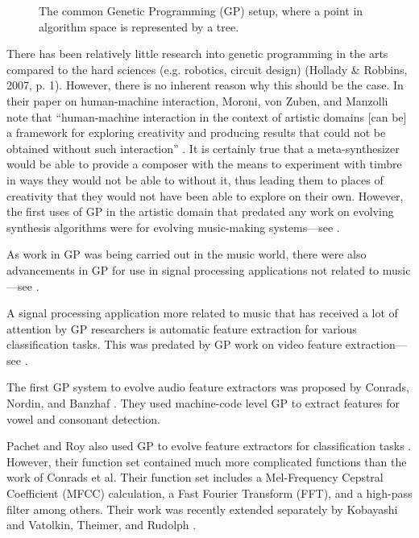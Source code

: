 \documentclass[a4paper,12pt]{report} 	%
\numberwithin{figure}{chapter}
\numberwithin{table}{chapter}
\numberwithin{equation}{chapter}
\begin{document}
\begin{flushleft}
\begin{figure}[h!]
\begin{center}
\caption[The Genetic Programming Paradigm]{The common Genetic Programming (GP) setup, where a point in algorithm space is represented by a tree.}
\end{center}
\end{figure}
There has been relatively little research into genetic programming in the arts compared to the hard sciences (e.g. robotics, circuit design) (Hollady \& Robbins, 2007, p. 1). However, there is no inherent reason why this should be the case. In their paper on human-machine interaction, Moroni, von Zuben, and Manzolli note that ``human-machine interaction in the context of artistic domains [can be] a framework for exploring creativity and producing results that could not be obtained without such interaction'' \cite[p. 185]{Moroni:2002oa}. It is certainly true that a meta-synthesizer would be able to provide a composer with the means to experiment with timbre in ways they would not be able to without it, thus leading them to places of creativity that they would not have been able to explore on their own. However, the first uses of GP in the artistic domain that predated any work on evolving synthesis algorithms were for evolving music-making systems---see \cite{Rowe:NoRead, Spector:1994ij, Johanson:1997gf, Polito:1997ly, Todd:1998t, Costelloe:2007bv}.

As work in GP was being carried out in the music world, there were also advancements in GP for use in signal processing applications not related to music---see \cite{Sharman:1995bs, Alcazar:1997ve, Koza:1997zr, Miller:1998zr, Uesaka:2000jw, Holladay:2007ct}.

A signal processing application more related to music that has received a lot of attention by GP researchers is automatic feature extraction for various classification tasks. This was predated by GP work on video feature extraction---see \cite{Harris:1997qf, Teller:1998ly}. 

The first GP system to evolve audio feature extractors was proposed by Conrads, Nordin, and Banzhaf \cite{Conrads:1998w}. They used machine-code level GP to extract features for vowel and consonant detection. 

Pachet and Roy also used GP to evolve feature extractors for classification tasks \cite{Pachet:2007if}. However, their function set contained much more complicated functions than the work of Conrads et al. Their function set includes a Mel-Frequency Cepstral Coefficient (MFCC) calculation, a Fast Fourier Transform (FFT), and a high-pass filter among others. Their work was recently extended separately by Kobayashi and Vatolkin, Theimer, and Rudolph \cite{Kobayashi:2009la, Vatolkin:2009bd}.


\end{flushleft}
\end{document}
